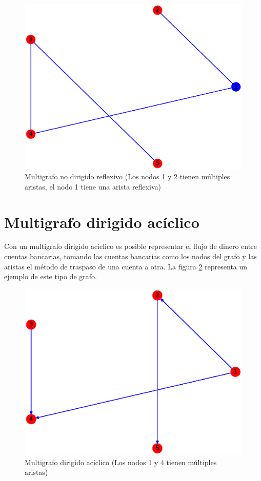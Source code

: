 \documentclass{article}
\begin{document}
\begin{figure}[H]
    \includegraphics[width=\textwidth]{9-MNDR}
    \caption{Multigrafo no dirigido reflexivo (Los nodos 1 y 2 tienen múltiples aristas, el nodo 1 tiene una arista reflexiva)}
    \label{fig:MNDR}
\end{figure}



\section{Multigrafo dirigido acíclico}
Con un multigrafo dirigido acíclico es posible representar el flujo de dinero entre cuentas bancarias, tomando las cuentas bancarias como los nodos del grafo y las aristas el método de traspaso de una cuenta a otra. La figura \ref{fig:MDA} representa un ejemplo de este tipo de grafo.
\begin{figure}[H]
    \includegraphics[width=\textwidth]{10-MDA}
    \caption{Multigrafo dirigido acíclico (Los nodos 1 y 4 tienen múltiples aristas)}
    \label{fig:MDA}
\end{figure}
\end{document}
